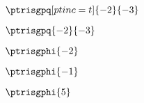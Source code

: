\documentclass[10pt,a4paper]{article}
\begin{document}
$\ptrisgpq[ptinc = t] {-2}{-3}$

$\ptrisgpq{-2}{-3}$


$\ptrisgphi{-2}$

$\ptrisgphi{-1}$

$\ptrisgphi{5}$
%
\end{document}
